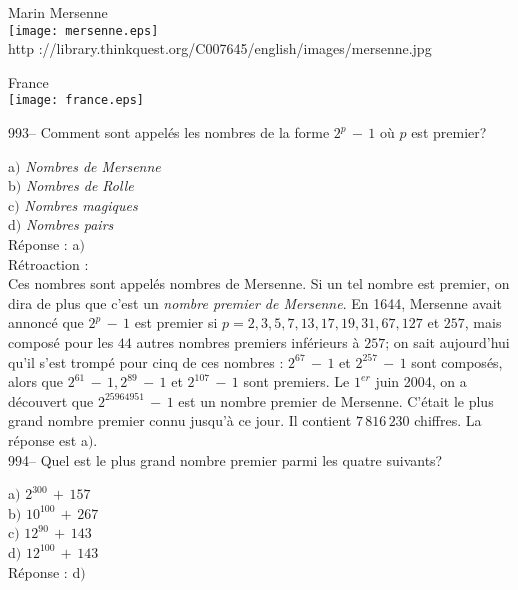 ﻿\documentclass[letterpaper, 12pt]{article}
\begin{document}
        \begin{center}
        Marin Mersenne\\
    \texttt{[image: mersenne.eps]}\\
        {\footnotesize http
://library.thinkquest.org/C007645/english/images/mersenne.jpg}
    \end{center}

        \begin{center}
        France\\
    \texttt{[image: france.eps]}\\
    \end{center}

993-- Comment sont appel\'es les nombres de la forme $2^p\,-\,1$
o\`u $p$ est premier?

a$)$ {\sl Nombres de Mersenne} \\
b$)$ {\sl Nombres de Rolle} \\
c$)$ {\sl Nombres magiques} \\
d$)$ {\sl Nombres pairs}\\

R\'eponse : a$)$\\

R\'etroaction : \\
Ces nombres sont appel\'es nombres de Mersenne. Si un tel nombre est
premier, on dira de plus que c'est un {\sl nombre premier de
Mersenne}. En 1644, Mersenne avait annonc\'e que $2^p\,-\,1$ est
premier si $p=2,3,5,7,13,17,19,31,67,127$ et $257$, mais compos\'e
pour les $44$ autres nombres premiers inf\'erieurs \`a $257$; on
sait aujourd'hui qu'il s'est tromp\'e pour cinq de ces nombres :
$2^{67}\,-\,1$ et $2^{257}\,-\,1$ sont compos\'es, alors que
$2^{61}\,-\,1,2^{89}\,-\,1$ et $2^{107}\,-\,1$ sont premiers. Le
$1^{er}$ juin 2004, on a d\'ecouvert que $2^{25 964 951}\,-\,1$ est
un nombre premier de Mersenne. C'\'etait le plus grand nombre
premier connu jusqu'\`a ce jour. Il contient $7\,816\,230$ chiffres.
La r\'eponse est a$)$.\\

994-- Quel est le plus grand nombre premier parmi les quatre
suivants?

a$)$ $2^{300}\,+\,157$ \\
b$)$ $10^{100}\,+\,267$ \\
c$)$ $12^{90}\,+\,143$ \\
d$)$ $12^{100}\,+\,143$\\

R\'eponse : d$)$\\
\end{document}
